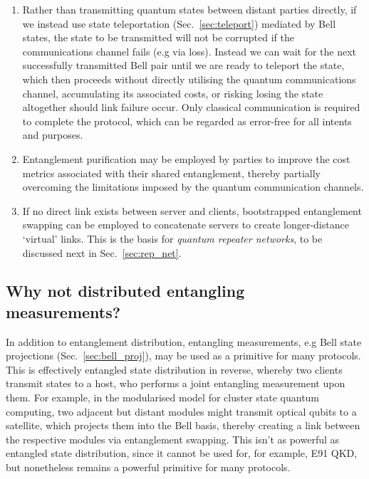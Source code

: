 \begin{enumerate}
\item Rather than transmitting quantum states between distant parties directly, if we instead use state teleportation (Sec.~\ref{sec:teleport}) mediated by Bell states, the state to be transmitted will not be corrupted if the communications channel fails (e.g via loss). Instead we can wait for the next successfully transmitted Bell pair until we are ready to teleport the state, which then proceeds without directly utilising the quantum communications channel, accumulating its associated costs, or risking losing the state altogether should link failure occur. Only classical communication is required to complete the protocol, which can be regarded as error-free for all intents and purposes.
\item Entanglement purification may be employed by parties to improve the cost metrics associated with their shared entanglement, thereby partially overcoming the limitations imposed by the quantum communication channels.
\item If no direct link exists between server and clients, bootstrapped entanglement swapping can be employed to concatenate servers to create longer-distance `virtual' links. This is the basis for \textit{quantum repeater networks}, to be discussed next in Sec.~\ref{sec:rep_net}.
\end{enumerate}

%
%

\subsection{Why not distributed entangling measurements?}

In addition to entanglement distribution, entangling measurements, e.g Bell state projections (Sec.~\ref{sec:bell_proj}), may be used as a primitive for many protocols. This is effectively entangled state distribution in reverse, whereby two clients transmit states to a host, who performs a joint entangling measurement upon them. For example, in the modularised model for cluster state quantum computing, two adjacent but distant modules might transmit optical qubits to a satellite, which projects them into the Bell basis, thereby creating a link between the respective modules via entanglement swapping. This isn't as powerful as entangled state distribution, since it cannot be used for, for example, E91 QKD, but nonetheless remains a powerful primitive for many protocols.

